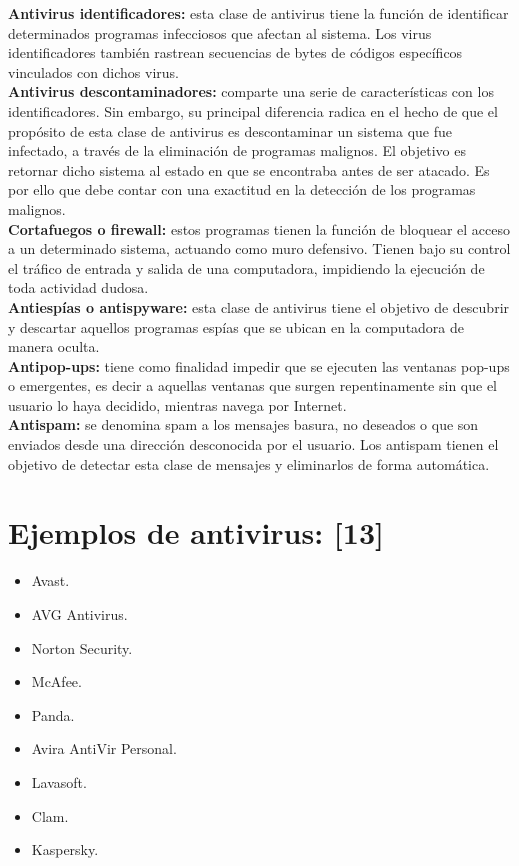 \documentclass[12pt,a4paper]{article}
\begin{document}
	\textbf{Antivirus identificadores:} esta clase de antivirus tiene la función de identificar determinados programas infecciosos que afectan al sistema. Los virus identificadores también rastrean secuencias de bytes de códigos específicos vinculados con dichos virus.\\
	
	\textbf{Antivirus descontaminadores:} comparte una serie de características con los identificadores. Sin embargo, su principal diferencia radica en el hecho de que el propósito de esta clase de antivirus es descontaminar un sistema que fue infectado, a través de la eliminación de programas malignos. El objetivo es retornar dicho sistema al estado en que se encontraba antes de ser atacado. Es por ello que debe contar con una exactitud en la detección de los programas malignos.\\
	
	\textbf{Cortafuegos o firewall:} estos programas tienen la función de bloquear el acceso a un determinado sistema, actuando como muro defensivo. Tienen bajo su control el tráfico de entrada y salida de una computadora, impidiendo la ejecución de toda actividad dudosa.\\
	
	\textbf{Antiespías o antispyware:} esta clase de antivirus tiene el objetivo de descubrir y descartar aquellos programas espías que se ubican en la computadora de manera oculta.\\
	
	\textbf{Antipop-ups:} tiene como finalidad impedir que se ejecuten las ventanas pop-ups o emergentes, es decir a aquellas ventanas que surgen repentinamente sin que el usuario lo haya decidido, mientras navega por Internet.\\
	
	\textbf{Antispam:} se denomina spam a los mensajes basura, no deseados o que son enviados desde una dirección desconocida por el usuario. Los antispam tienen el objetivo de detectar esta clase de mensajes y eliminarlos de forma automática.
	
	\section{Ejemplos de antivirus: [13]}
	\begin{itemize}
	\item Avast.
	\item AVG Antivirus.
	\item Norton Security.
	\item McAfee.
	\item Panda.
	\item Avira AntiVir Personal.
	\item Lavasoft.
	\item Clam.
	\item Kaspersky.
	 \end{itemize}
\end{document}
